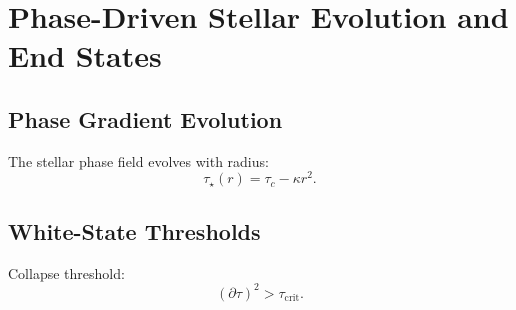 \chapter{Phase-Driven Stellar Evolution and End States}

\section{Phase Gradient Evolution}
The stellar phase field evolves with radius:
\[
\tau_\star(r) = \tau_c - \kappa r^2.
\]

\section{White-State Thresholds}
Collapse threshold:
\[
(\partial\tau)^2 > \tau_{\mathrm{crit}}.
\]

